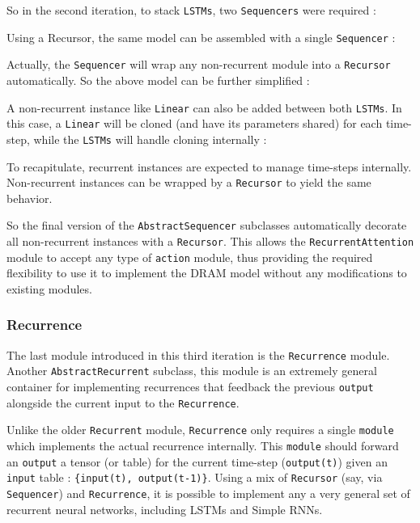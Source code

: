 \documentclass{article} %
\providecommand{\inlinecode}[1]{\texttt{#1}}
\begin{document}
So in the second iteration, to stack \inlinecode{LSTMs}, two \inlinecode{Sequencers} were required :



Using a Recursor, the same model can be assembled with a single \inlinecode{Sequencer} :



Actually, the \inlinecode{Sequencer} will wrap any non-recurrent module into a \inlinecode{Recursor} automatically.
So the above model can be further simplified :



A non-recurrent instance like \inlinecode{Linear} can also be added between both \inlinecode{LSTMs}. 
In this case, a \inlinecode{Linear} will be cloned (and have its parameters shared) for each time-step, 
while the \inlinecode{LSTMs} will handle cloning internally :



To recapitulate, recurrent instances are expected to manage time-steps internally. 
Non-recurrent instances can be wrapped by a \inlinecode{Recursor} to yield the same behavior.

So the final version of the \inlinecode{AbstractSequencer} subclasses
automatically decorate all non-recurrent instances with a \inlinecode{Recursor}. 
This allows the \inlinecode{RecurrentAttention} module to accept 
any type of \inlinecode{action} module, thus providing the required flexibility to use it to 
implement the DRAM model without any modifications to existing modules.

\subsubsection{Recurrence}

The last module introduced in this third iteration is the \inlinecode{Recurrence} module.
Another \inlinecode{AbstractRecurrent} subclass, this module
is an extremely general container for implementing recurrences that feedback the previous \inlinecode{output} 
alongside the current {input} to the \inlinecode{Recurrence}. 



Unlike the older \inlinecode{Recurrent} module, \inlinecode{Recurrence} only 
requires a single \inlinecode{module} which implements the actual 
recurrence internally.
This \inlinecode{module} should forward an \inlinecode{output} a tensor (or table) for the current time-step (\inlinecode{output(t)}) 
given an \inlinecode{input} table : \inlinecode{\{input(t), output(t-1)\}}.
Using a mix of \inlinecode{Recursor} (say, via \inlinecode{Sequencer}) and \inlinecode{Recurrence}, 
it is possible to implement any a very general set of recurrent neural networks, including LSTMs and Simple RNNs.
\end{document}
